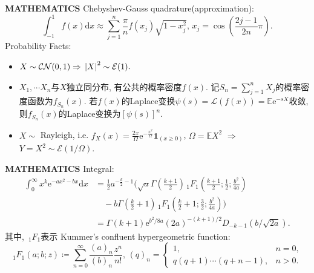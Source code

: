 \documentclass[aspectratio=169]{beamer}
\begin{document}
\begin{frame}{\textbf{{\LARGE{M}}ATHEMATICS}}
	Chebyshev-Gauss quadrature(approximation):
	\begin{equation}
		\int_{-1}^{1}f(x)\mathrm{d}x \approx \sum_{j=1}^n \frac{\pi}{n} f(x_j)\sqrt{1-x_j^2},\, x_j = \cos(\frac{2j - 1}{2n}\pi).
	\end{equation}	
	Probability Facts: \begin{itemize}
		\item $X\sim \mathcal{CN}(0,1) \Rightarrow\, \abs{X}^2\sim \mathcal{E}(1).$
		\item $X_1,\cdots X_n$与$X$独立同分布, 有公共的概率密度$f(x)$. 记$S_n = \sum_{j=1}^n X_j$的概率密度函数为$f_{S_n}(x)$. 若$f(x)$的Laplace变换$\psi(s) = \mathcal{L}(f(x)) = \mathbb{E}\mathrm{e}^{-sX}$收敛, 则$f_{S_n}(x)$的Laplace变换为$[\psi(s)]^n$.
		\item $X\sim$ Rayleigh, i.e. $f_X(x) = \frac{2x}{\Omega}\mathrm{e}^{-\frac{x^2}{\Omega}}\bm{1}_{(x\geqslant 0)}$, $\Omega = \mathbb{E}X^2$ $\Rightarrow$ $Y=X^2\sim \mathcal{E}(1/\Omega)$.
	\end{itemize}
	
	
\end{frame}

\begin{frame}{\textbf{{\LARGE{M}}ATHEMATICS}}
	Integral:
	\begin{equation}
		\begin{split}
		\int_0^{\infty}x^k \mathrm{e}^{-a x^2-b x}\mathrm{d}x &= \frac{1}{2} a^{-\frac{k}{2}-1} \bigg(\sqrt{a} \Gamma \left(\frac{k+1}{2}\right)
			\, _1F_1\left(\frac{k+1}{2};\frac{1}{2};\frac{b^2}{4 a}\right) \\
			&\,\,\,\,\,\,-b \Gamma
			\left(\frac{k}{2}+1\right) \, _1F_1\left(\frac{k}{2}+1;\frac{3}{2};\frac{b^2}{4
				a}\right)\bigg)\\
			&= \Gamma(k+1)\mathrm{e}^{b^2/8a}(2a)^{-(k+1)/2}D_{-k-1}(b/\sqrt{2a}).
			\end{split}
	\end{equation}
	其中, $\,_1F_1$表示 Kummer's confluent hypergeometric function: \begin{equation}
		\,_1F_1(a;b;z)\coloneqq \sum_{n=0}^{\infty} \frac{(a)_n}{(b)_n}\frac{z^n}{n!},\, (q)_n = \begin{cases}
			1,&n = 0,\\
			q(q+1)\cdots(q+n-1), &n>0.
		\end{cases}
	\end{equation}
\end{frame}
\end{document}
